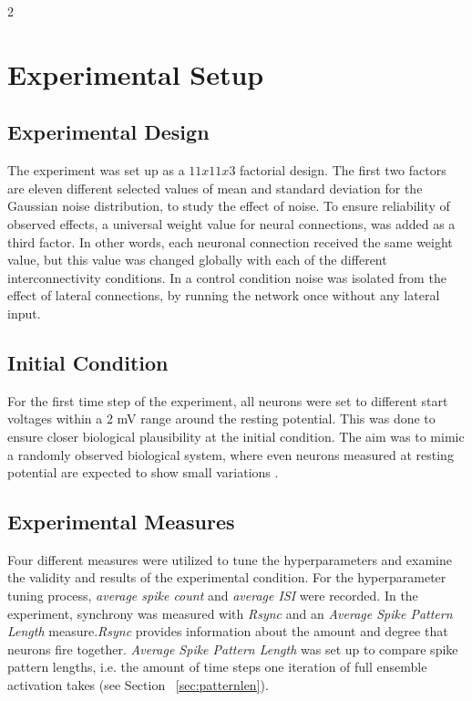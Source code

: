 \documentclass[12pt,a4paper]{article}
\begin{document}
\begin{multicols}{2}
        \section{Experimental Setup}
		\subsection{Experimental Design}    
			The experiment was set up as a $11 x 11 x 3$ factorial design. The first two factors are eleven different selected values of mean and standard deviation for the Gaussian noise distribution, to study the effect of noise. To ensure reliability of observed effects, a  universal weight value for neural connections, was added as a third factor. In other words, each neuronal connection received the same weight value, but this value was changed globally with each of the different interconnectivity conditions. In a control condition noise was isolated from the effect of lateral connections, by running the network once without any lateral input.
            
        \subsection{Initial Condition}
            For the first time step of the experiment, all neurons were set to different start voltages within a 2 mV range around the resting potential. This was done to ensure closer biological plausibility at the initial condition. The aim was to mimic a randomly observed biological system, where even neurons measured at resting potential are expected to show small variations \cite{O}.
            
        \subsection{Experimental Measures}
            Four different measures were utilized to tune the hyperparameters and examine the validity and results of the experimental condition. For the hyperparameter tuning process, \textit{average spike count} and \textit{average ISI} were recorded. In the experiment, synchrony was measured with \textit{Rsync} and an \textit{Average Spike Pattern Length} measure.\textit{Rsync} provides information about the amount and degree that neurons fire together. \textit{Average Spike Pattern Length} was set up to compare spike pattern lengths, i.e. the amount of time steps one iteration of full ensemble activation takes (see Section ~\ref{sec:patternlen}).
            

\end{multicols}
\end{document}
